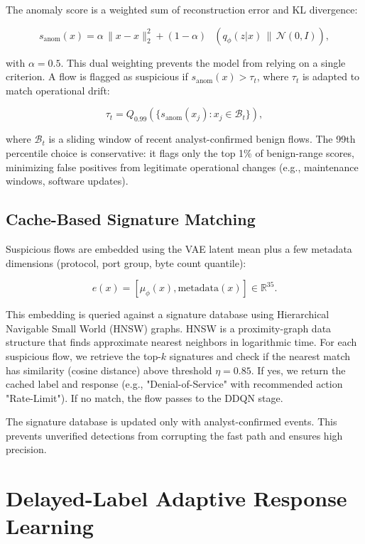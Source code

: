 \documentclass[preprint,12pt]{elsarticle}
\DeclareMathOperator{\KL}{D_{\mathrm{KL}}}
\begin{document}
The anomaly score is a weighted sum of reconstruction error and KL divergence:

\begin{equation}
s_{\text{anom}}(x) = \alpha \, \|\!x - \hat{x}\!\|_2^2 + (1-\alpha) \, \KL\!\left(q_\phi(z|x) \,\|\, \mathcal{N}(0, I)\right),
\label{eq:anom_score}
\end{equation}

with $\alpha = 0.5$. This dual weighting prevents the model from relying on a single criterion. A flow is flagged as suspicious if $s_{\text{anom}}(x) > \tau_t$, where $\tau_t$ is adapted to match operational drift:

\begin{equation}
\tau_t = Q_{0.99}\left(\{s_{\text{anom}}(x_j) : x_j \in \mathcal{B}_t\}\right),
\label{eq:threshold}
\end{equation}

where $\mathcal{B}_t$ is a sliding window of recent analyst-confirmed benign flows. The 99th percentile choice is conservative: it flags only the top 1\% of benign-range scores, minimizing false positives from legitimate operational changes (e.g., maintenance windows, software updates).

\subsection{Cache-Based Signature Matching}

Suspicious flows are embedded using the VAE latent mean plus a few metadata dimensions (protocol, port group, byte count quantile):

\[
e(x) = [\mu_\phi(x), \text{metadata}(x)] \in \mathbb{R}^{35}.
\]

This embedding is queried against a signature database using Hierarchical Navigable Small World (HNSW) graphs. HNSW is a proximity-graph data structure that finds approximate nearest neighbors in logarithmic time. For each suspicious flow, we retrieve the top-$k$ signatures and check if the nearest match has similarity (cosine distance) above threshold $\eta = 0.85$. If yes, we return the cached label and response (e.g., "Denial-of-Service" with recommended action "Rate-Limit"). If no match, the flow passes to the DDQN stage.

The signature database is updated only with analyst-confirmed events. This prevents unverified detections from corrupting the fast path and ensures high precision.

\section{Delayed-Label Adaptive Response Learning}
\label{sec:response}
\end{document}
